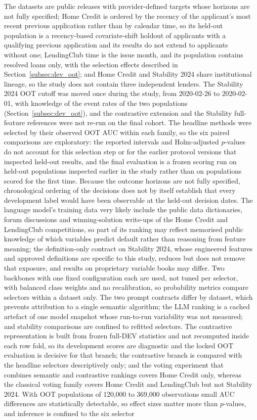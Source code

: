 \documentclass[final,5p,twocolumn]{elsarticle}
\begin{document}
The datasets are public releases with provider-defined targets whose horizons are not fully specified; Home Credit is ordered by the recency of the applicant's most recent previous application rather than by calendar time, so its held-out population is a recency-based covariate-shift holdout of applicants with a qualifying previous application and its results do not extend to applicants without one; LendingClub time is the issue month, and its population contains resolved loans only, with the selection effects described in Section~\ref{subsec:dev_oot}; and Home Credit and Stability 2024 share institutional lineage, so the study does not contain three independent lenders. The Stability 2024 OOT cutoff was moved once during the study, from 2020-02-26 to 2020-02-01, with knowledge of the event rates of the two populations (Section~\ref{subsec:dev_oot}), and the contrastive extension and the Stability full-feature references were not re-run on the final cohort. The headline methods were selected by their observed OOT AUC within each family, so the six paired comparisons are exploratory: the reported intervals and Holm-adjusted $p$-values do not account for this selection step or for the earlier protocol versions that inspected held-out results, and the final evaluation is a frozen scoring run on held-out populations inspected earlier in the study rather than on populations scored for the first time. Because the outcome horizons are not fully specified, chronological ordering of the decisions does not by itself establish that every development label would have been observable at the held-out decision dates. The language model's training data very likely include the public data dictionaries, forum discussions and winning-solution write-ups of the Home Credit and LendingClub competitions, so part of its ranking may reflect memorised public knowledge of which variables predict default rather than reasoning from feature meaning; the definition-only contract on Stability 2024, whose engineered features and approved definitions are specific to this study, reduces but does not remove that exposure, and results on proprietary variable books may differ. Two backbones with one fixed configuration each are used, not tuned per selector, with balanced class weights and no recalibration, so probability metrics compare selectors within a dataset only. The two prompt contracts differ by dataset, which prevents attribution to a single semantic algorithm; the LLM ranking is a cached artefact of one model snapshot whose run-to-run variability was not measured; and stability comparisons are confined to refitted selectors. The contrastive representation is built from frozen full-DEV statistics and not recomputed inside each row fold, so its development scores are diagnostic and the locked OOT evaluation is decisive for that branch; the contrastive branch is compared with the headline selectors descriptively only; and the voting experiment that combines semantic and contrastive rankings covers Home Credit only, whereas the classical voting family covers Home Credit and LendingClub but not Stability 2024. With OOT populations of 120,000 to 369,000 observations small AUC differences are statistically detectable, so effect sizes matter more than $p$-values, and inference is confined to the six selector 
\end{document}
